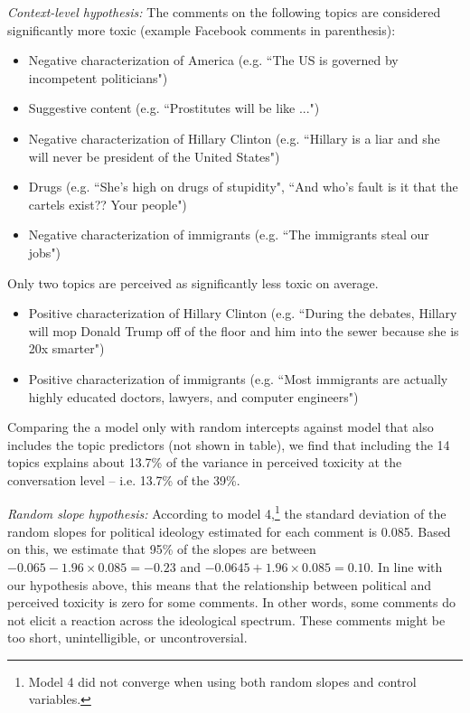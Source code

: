 \documentclass{article}
\begin{document}
\textit{Context-level hypothesis:} The comments on the following topics are considered significantly more toxic (example Facebook comments in parenthesis): 
\begin{itemize}
    \item Negative characterization of America (e.g. ``The US is governed by incompetent politicians")
    \item Suggestive content (e.g. ``Prostitutes will be like ...")
    \item Negative characterization of Hillary Clinton (e.g. ``Hillary is a liar and she will never be president of the United States")
    \item Drugs (e.g. ``She's high on drugs of stupidity", ``And who's fault is it that the cartels exist?? Your people")
    \item Negative characterization of immigrants (e.g. ``The immigrants steal our jobs")
\end{itemize}

Only two topics are perceived as significantly less toxic on average.

\begin{itemize}
    \item Positive characterization of Hillary Clinton (e.g. ``During the debates, Hillary will mop Donald Trump off of the floor and him into the sewer because she is 20x smarter")
    \item Positive characterization of immigrants (e.g. ``Most immigrants are actually highly educated doctors, lawyers, and computer engineers")
\end{itemize}

Comparing the a model only with random intercepts against model that also includes the topic predictors (not shown in table), we find that including the 14 topics explains about 13.7\% of the variance in perceived toxicity at the conversation level -- i.e. 13.7\% of the 39\%. 



\textit{Random slope hypothesis:} According to model 4,\footnote{Model 4 did not converge when using both random slopes and control variables.} the standard deviation of the random slopes for political ideology estimated for each comment is 0.085. Based on this, we estimate that 95\% of the slopes are between $-0.065 - 1.96\times 0.085=-0.23$ and  $-0.0645 + 1.96 \times 0.085=0.10$. In line with our hypothesis above, this means that the relationship between political and perceived toxicity is zero for some comments. In other words, some comments do not elicit a reaction across the ideological spectrum. These comments might be too short, unintelligible, or uncontroversial.
\end{document}
